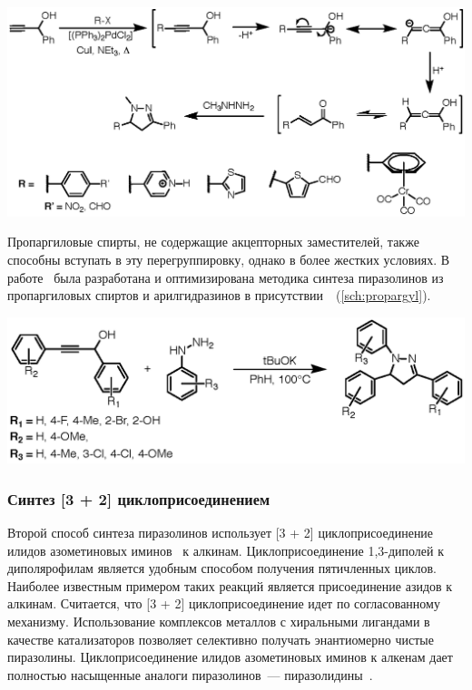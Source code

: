 \begin{scheme}
    \centering
    \includegraphics{sections/literature/img/sonogashira.eps}
    \caption{}
    \label{sch:sonogashira}
\end{scheme}

Пропаргиловые спирты, не содержащие акцепторных заместителей, также способны вступать в эту перегруппировку, однако в более жестких условиях.
В работе~\cite{Wang2014} была разработана и оптимизирована методика синтеза пиразолинов из пропаргиловых спиртов и арилгидразинов в присутствии~~(\ref{sch:propargyl}).

\begin{scheme}
    \centering
    \includegraphics{sections/literature/img/propargyl.eps}
    \caption{}
    \label{sch:propargyl}
\end{scheme}

\subsubsection{Синтез [3 + 2] циклоприсоединением}

Второй способ синтеза пиразолинов использует [3 + 2] циклоприсоединение илидов азометиновых иминов~\textbf{} к алкинам. Циклоприсоединение 1,3-диполей к диполярофилам является удобным способом получения пятичленных циклов. Наиболее известным примером таких реакций является присоединение азидов к алкинам. Считается, что [3 + 2] циклоприсоединение идет по согласованному механизму. Использование комплексов металлов с хиральными лигандами в качестве катализаторов позволяет селективно получать энантиомерно чистые пиразолины. Циклоприсоединение илидов азометиновых иминов к алкенам дает полностью насыщенные аналоги пиразолинов~--- пиразолидины~\cite{Groselj2018}. 

